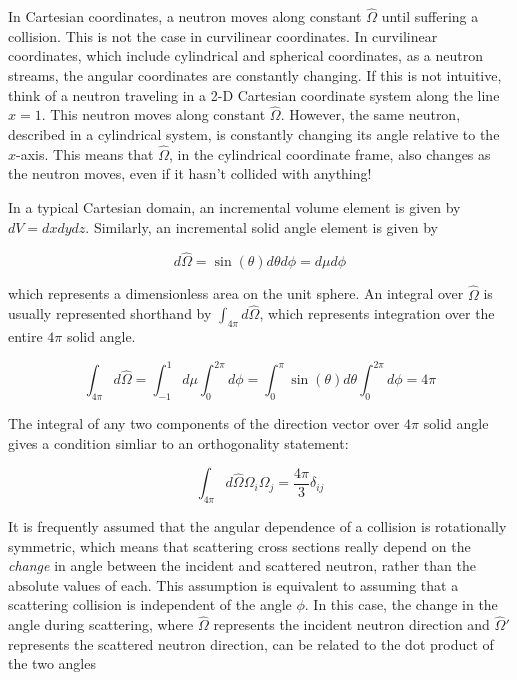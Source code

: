 \documentclass[10pt]{article}
\begin{document}
\begin{flushleft}
In Cartesian coordinates, a neutron moves along constant \(\hat{\Omega}\) until suffering a collision. This is not the case in curvilinear coordinates. In curvilinear coordinates, which include cylindrical and spherical coordinates, as a neutron streams, the angular coordinates are constantly changing. If this is not intuitive, think of a neutron traveling in a 2-D Cartesian coordinate system along the line \(x = 1\). This neutron moves along constant \(\hat{\Omega}\). However, the same neutron, described in a cylindrical system, is constantly changing its angle relative to the \(x\)-axis. This means that \(\hat{\Omega}\), in the cylindrical coordinate frame, also changes as the neutron moves, even if it hasn't collided with anything!

In a typical Cartesian domain, an incremental volume element is given by \(dV = dxdydz\). Similarly, an incremental solid angle element is given by 

\begin{equation} %
\label{eq:DifferentialOmega}
d\hat{\Omega}=\sin{(\theta)}d\theta d\phi=d\mu d\phi
\end{equation}

which represents a dimensionless area on the unit sphere. An integral over \(\hat{\Omega}\) is usually represented shorthand by \(\int_{4\pi}^{ } d\hat{\Omega}\), which represents integration over the entire \(4\pi\) solid angle.

\begin{equation}
\label{eq:4PiOmegaIntegral}
\int_{4\pi}^{ } d\hat{\Omega} = \int_{-1}^{1} d\mu \int_{0}^{2\pi} d\phi = \int_{0}^{\pi} \sin{(\theta)}d\theta \int_{0}^{2\pi} d\phi = 4\pi
\end{equation}

The integral of any two components of the direction vector over \(4\pi\) solid angle gives a condition simliar to an orthogonality statement:

\begin{equation}
\label{eq:4PiOmegaOmega}
\int_{4\pi}^{ } d\hat{\Omega}\Omega_i\Omega_j = \frac{4\pi}{3}\delta_{ij}
\end{equation}

It is frequently assumed that the angular dependence of a collision is rotationally symmetric, which means that scattering cross sections really depend on the \textit{change} in angle between the incident and scattered neutron, rather than the absolute values of each. This assumption is equivalent to assuming that a scattering collision is independent of the angle \(\phi\). In this case, the change in the angle during scattering, where \(\hat{\Omega}\) represents the incident neutron direction and \(\hat{\Omega}'\) represents the scattered neutron direction, can be related to the dot product of the two angles


\end{flushleft}
\end{document}
